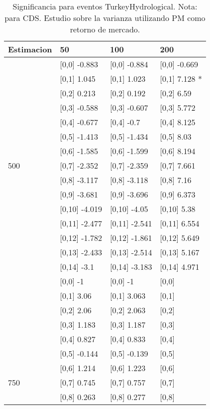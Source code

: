 \begin{table}

\caption{Significancia para eventos TurkeyHydrological. Nota: para CDS. Estudio sobre la varianza utilizando PM como retorno de mercado.}
\centering
\begin{tabular}[t]{llll}
\toprule
Estimacion & 50 & 100 & 200\\
\midrule
 & {}[0,0] -0.883 & {}[0,0] -0.884 & {}[0,0] -0.669\\
 & {}[0,1] 1.045 & {}[0,1] 1.023 & {}[0,1] 7.128 *\\
 & {}[0,2] 0.213 & {}[0,2] 0.192 & {}[0,2] 6.59\\
 & {}[0,3] -0.588 & {}[0,3] -0.607 & {}[0,3] 5.772\\
 & {}[0,4] -0.677 & {}[0,4] -0.7 & {}[0,4] 8.125\\
\addlinespace
 & {}[0,5] -1.413 & {}[0,5] -1.434 & {}[0,5] 8.03\\
 & {}[0,6] -1.585 & {}[0,6] -1.599 & {}[0,6] 8.194\\
500 & {}[0,7] -2.352 & {}[0,7] -2.359 & {}[0,7] 7.661\\
 & {}[0,8] -3.117 & {}[0,8] -3.118 & {}[0,8] 7.16\\
 & {}[0,9] -3.681 & {}[0,9] -3.696 & {}[0,9] 6.373\\
\addlinespace
 & {}[0,10] -4.019 & {}[0,10] -4.05 & {}[0,10] 5.38\\
 & {}[0,11] -2.477 & {}[0,11] -2.541 & {}[0,11] 6.554\\
 & {}[0,12] -1.782 & {}[0,12] -1.861 & {}[0,12] 5.649\\
 & {}[0,13] -2.433 & {}[0,13] -2.514 & {}[0,13] 5.167\\
 & {}[0,14] -3.1 & {}[0,14] -3.183 & {}[0,14] 4.971\\
\addlinespace
 & {}[0,0] -1 & {}[0,0] -1 & {}[0,0]\\
 & {}[0,1] 3.06 & {}[0,1] 3.063 & {}[0,1]\\
 & {}[0,2] 2.06 & {}[0,2] 2.063 & {}[0,2]\\
 & {}[0,3] 1.183 & {}[0,3] 1.187 & {}[0,3]\\
 & {}[0,4] 0.827 & {}[0,4] 0.833 & {}[0,4]\\
\addlinespace
 & {}[0,5] -0.144 & {}[0,5] -0.139 & {}[0,5]\\
 & {}[0,6] 1.214 & {}[0,6] 1.223 & {}[0,6]\\
750 & {}[0,7] 0.745 & {}[0,7] 0.757 & {}[0,7]\\
 & {}[0,8] 0.263 & {}[0,8] 0.277 & {}[0,8]\\

\end{tabular}
\end{table}
